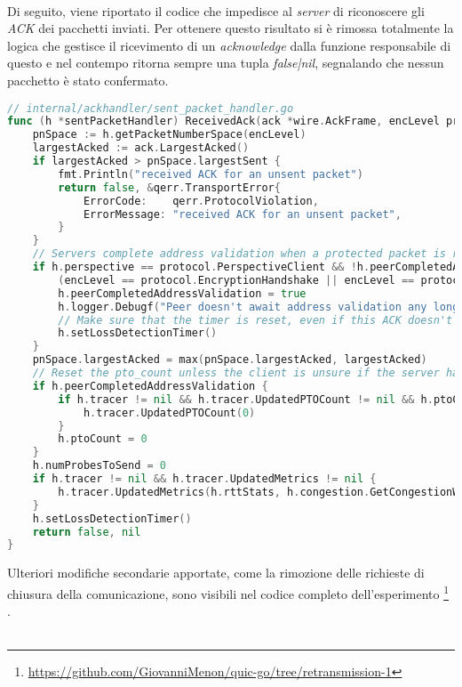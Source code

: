 \\
Di seguito, viene riportato il codice che impedisce al \emph{server} di riconoscere gli \emph{ACK} dei pacchetti inviati. 
Per ottenere questo risultato si è rimossa totalmente la logica che gestisce il ricevimento di un \emph{acknowledge} dalla funzione responsabile di questo e nel contempo ritorna sempre una tupla \emph{false|nil}, 
segnalando che nessun pacchetto è stato confermato.
\\
\begin{lstlisting}[language=Go]
// internal/ackhandler/sent_packet_handler.go
func (h *sentPacketHandler) ReceivedAck(ack *wire.AckFrame, encLevel protocol.EncryptionLevel, rcvTime time.Time) (bool /* contained 1-RTT packet */, error) { 
    pnSpace := h.getPacketNumberSpace(encLevel)
    largestAcked := ack.LargestAcked()
    if largestAcked > pnSpace.largestSent {
        fmt.Println("received ACK for an unsent packet")
        return false, &qerr.TransportError{
            ErrorCode:    qerr.ProtocolViolation,
            ErrorMessage: "received ACK for an unsent packet",
        }
    }
    // Servers complete address validation when a protected packet is received.
    if h.perspective == protocol.PerspectiveClient && !h.peerCompletedAddressValidation &&
        (encLevel == protocol.EncryptionHandshake || encLevel == protocol.Encryption1RTT) {
        h.peerCompletedAddressValidation = true
        h.logger.Debugf("Peer doesn't await address validation any longer.")
        // Make sure that the timer is reset, even if this ACK doesn't acknowledge any (ack-eliciting) packets.
        h.setLossDetectionTimer()
    }
    pnSpace.largestAcked = max(pnSpace.largestAcked, largestAcked)
    // Reset the pto_count unless the client is unsure if the server has validated the client's address.
	if h.peerCompletedAddressValidation {
		if h.tracer != nil && h.tracer.UpdatedPTOCount != nil && h.ptoCount != 0 {
			h.tracer.UpdatedPTOCount(0)
		}
		h.ptoCount = 0
	}
	h.numProbesToSend = 0
	if h.tracer != nil && h.tracer.UpdatedMetrics != nil {
		h.tracer.UpdatedMetrics(h.rttStats, h.congestion.GetCongestionWindow(), h.bytesInFlight, h.packetsInFlight())
	}
	h.setLossDetectionTimer()
	return false, nil
}
\end{lstlisting}
\noindent Ulteriori modifiche secondarie apportate, come la rimozione delle richieste di chiusura della comunicazione, sono visibili nel codice completo dell'esperimento \footnote{\url{https://github.com/GiovanniMenon/quic-go/tree/retransmission-1}} \cite{site:my-fork}.
\\\\
